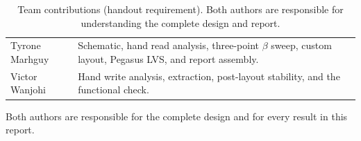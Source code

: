 \documentclass[10pt,letterpaper]{article}
\begin{document}
\begin{table}[H]\centering\small
\caption{Team contributions (handout requirement). Both authors are responsible for understanding the complete design and report.}\label{tab:contrib}
\begin{tabularx}{\linewidth}{@{}p{.28\linewidth}X@{}}\toprule
Tyrone Marhguy & Schematic, hand read analysis, three-point $\beta$ sweep, custom layout, Pegasus LVS, and report assembly. \\
Victor Wanjohi & Hand write analysis, extraction, post-layout stability, and the functional check. \\\bottomrule
\end{tabularx}
\end{table}
Both authors are responsible for the complete design and for every result in this report.
\end{document}

